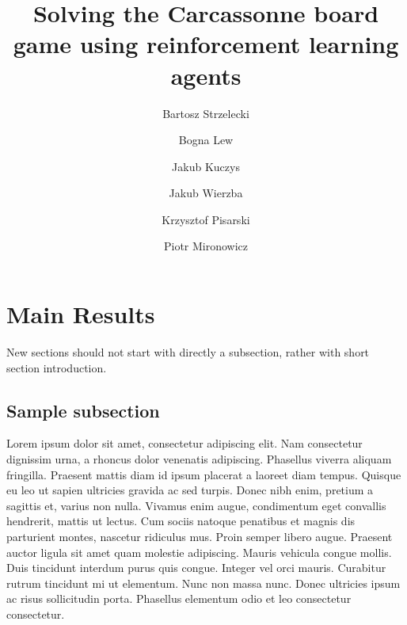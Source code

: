 \documentclass[11pt,twocolumn]{article}
\begin{document}
\title{Solving the Carcassonne board game using reinforcement learning agents}
\author[1]{Bartosz Strzelecki}
\author[1]{Bogna Lew}
\author[1]{Jakub Kuczys}
\author[1]{Jakub Wierzba}
\author[1]{Krzysztof Pisarski}
\author[2]{Piotr Mironowicz}


\maketitle
\begin{abstract}

  
  
\end{abstract}





\section{Main Results}
New sections should not start with directly a subsection, rather with short section introduction. 

\subsection{Sample subsection}
Lorem ipsum dolor sit amet, consectetur adipiscing elit. Nam consectetur dignissim urna, a rhoncus dolor venenatis adipiscing. Phasellus viverra aliquam fringilla. Praesent mattis diam id ipsum placerat a laoreet diam tempus. Quisque eu leo ut sapien ultricies gravida ac sed turpis. Donec nibh enim, pretium a sagittis et, varius non nulla. Vivamus enim augue, condimentum eget convallis hendrerit, mattis ut lectus. Cum sociis natoque penatibus et magnis dis parturient montes, nascetur ridiculus mus. Proin semper libero augue. Praesent auctor ligula sit amet quam molestie adipiscing. Mauris vehicula congue mollis. Duis tincidunt interdum purus quis congue. Integer vel orci mauris. Curabitur rutrum tincidunt mi ut elementum. Nunc non massa nunc. Donec ultricies ipsum ac risus sollicitudin porta. Phasellus elementum odio et leo consectetur consectetur. 
\end{document}
